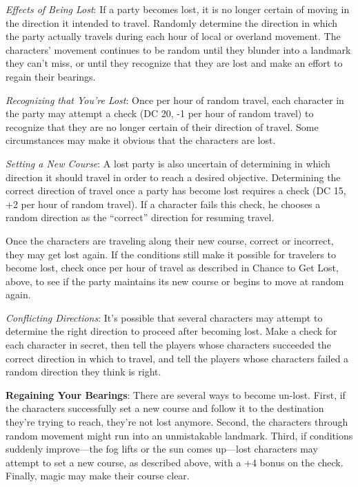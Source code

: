\textit{Effects of Being Lost}: If a party becomes lost, it is no longer certain of moving in the direction it intended to travel. Randomly determine the direction in which the party actually travels during each hour of local or overland movement. The characters' movement continues to be random until they blunder into a landmark they can't miss, or until they recognize that they are lost and make an effort to regain their bearings.

\textit{Recognizing that You're Lost}: Once per hour of random travel, each character in the party may attempt a  check (DC 20, -1 per hour of random travel) to recognize that they are no longer certain of their direction of travel. Some circumstances may make it obvious that the characters are lost.

\textit{Setting a New Course}: A lost party is also uncertain of determining in which direction it should travel in order to reach a desired objective. Determining the correct direction of travel once a party has become lost requires a  check (DC 15, +2 per hour of random travel). If a character fails this check, he chooses a random direction as the ``correct'' direction for resuming travel.

Once the characters are traveling along their new course, correct or incorrect, they may get lost again. If the conditions still make it possible for travelers to become lost, check once per hour of travel as described in Chance to Get Lost, above, to see if the party maintains its new course or begins to move at random again.

\textit{Conflicting Directions}: It's possible that several characters may attempt to determine the right direction to proceed after becoming lost. Make a  check for each character in secret, then tell the players whose characters succeeded the correct direction in which to travel, and tell the players whose characters failed a random direction they think is right.

\textbf{Regaining Your Bearings}: There are several ways to become un-lost. First, if the characters successfully set a new course and follow it to the destination they're trying to reach, they're not lost anymore. Second, the characters through random movement might run into an unmistakable landmark. Third, if conditions suddenly improve---the fog lifts or the sun comes up---lost characters may attempt to set a new course, as described above, with a +4 bonus on the  check. Finally, magic may make their course clear.
